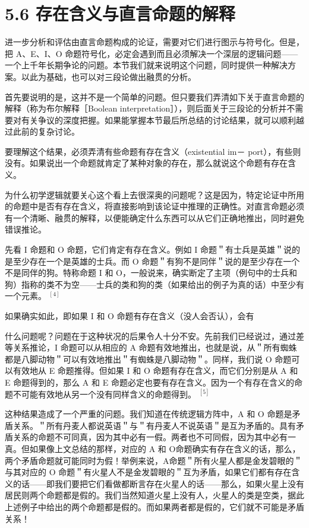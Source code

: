 \section*{5.6 存在含义与直言命题的解释}
进一步分析和评估由直言命题构成的论证，需要对它们进行图示与符号化。但是，把 A、E、I、O 命题符号化，必定会遇到而且必须解决一个深层的逻辑问题——一个上千年长期争论的问题。本节我们就来说明这个问题，同时提供一种解决方案。以此为基础，也可以对三段论做出融贯的分析。

首先要说明的是，这并不是一个简单的问题。但只要我们弄清如下关于直言命题的解释（称为布尔解释［Boolean interpretation］），则后面关于三段论的分析并不需要对有关争议的深度把握。如果能掌握本节最后所总结的讨论结果，就可以顺利越过此前的复杂讨论。

要理解这个结果，必须弄清有些命题有存在含义（existential im－ port），有些则没有。如果说出一个命题就肯定了某种对象的存在，那么就说这个命题有存在含义。

为什么初学逻辑就要关心这个看上去很深奥的问题呢？这是因为，特定论证中所用的命题中是否有存在含义，将直接影响到该论证中推理的正确性。对直言命题必须有一个清晰、融贯的解释，以便能确定什么东西可以从它们正确地推出，同时避免错误推论。

先看 I 命题和 O 命题，它们肯定有存在含义。例如 I 命题＂有士兵是英雄＂说的是至少存在一个是英雄的士兵。而 O 命题＂有狗不是同伴＂说的是至少存在一个不是同伴的狗。特称命题 I 和 O，一般说来，确实断定了主项（例句中的士兵和狗）指称的类不为空——士兵的类和狗的类（如果给出的例子为真的话）中至少有一个元素。 ${ }^{[4]}$

如果确实如此，即如果 I 和 O 命题有存在含义（没人会否认），会有

什么问题呢？问题在于这种状况的后果令人十分不安。先前我们已经说过，通过差等关系推论，I 命题可以从相应的 A 命题有效地推出，也就是说，从＂所有蜘蛛都是八脚动物＂可以有效地推出＂有蜘蛛是八脚动物＂。同样，我们说 O 命题可以有效地从 E 命题推得。但如果 I 和 O 命题有存在含义，而它们分别是从 A 和 E 命题得到的，那么 A 和 E 命题必定也要有存在含义。因为一个有存在含义的命题不可能有效地从另一个没有同样含义的命题得到。 ${ }^{[5]}$

这种结果造成了一个严重的问题。我们知道在传统逻辑方阵中，A 和 O 命题是矛盾关系。＂所有丹麦人都说英语＂与＂有丹麦人不说英语＂是互为矛盾的。具有矛盾关系的命题不可同真，因为其中必有一假。两者也不可同假，因为其中必有一真。但如果像上文总结的那样，对应的 A 和 O命题确实有存在含义的话，那么，两个矛盾命题就可能同时为假！举例来说，A命题＂所有火星人都是金发碧眼的＂与其对应的 O 命题＂有火星人不是金发碧眼的＂互为矛盾，如果它们都有存在含义的话——即我们要把它们看做都断言存在火星人的话——那么，如果火星上没有居民则两个命题都是假的。我们当然知道火星上没有人，火星人的类是空类，据此上述例子中给出的两个命题都是假的。而如果两者都是假的，它们就不可能是矛盾关系！

